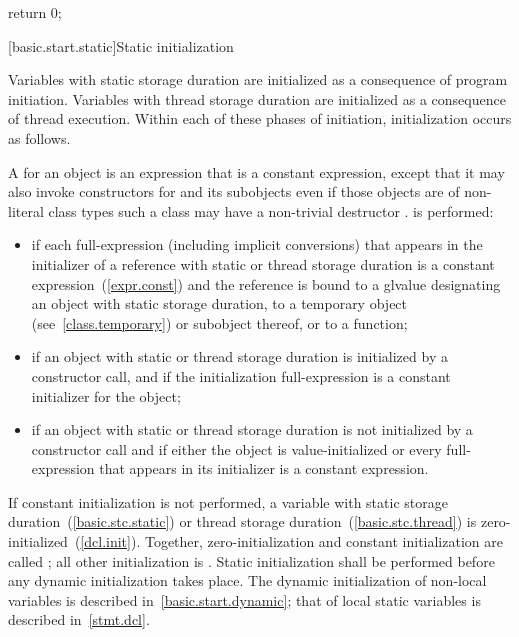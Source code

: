 \begin{codeblock}
return 0;
\end{codeblock}

[basic.start.static]{Static initialization}

\pnum
{}%
%
Variables with static storage duration
are initialized as a consequence of program initiation. Variables with
thread storage duration are initialized as a consequence of thread execution.
Within each of these phases of initiation, initialization occurs as follows.

\pnum
{}%
%
A  for an object  is an expression that is a
constant expression, except that it may also invoke  constructors
for  and its subobjects even if those objects are of non-literal class
types \enternote such a class may have a non-trivial destructor \exitnote.
 is performed:

\begin{itemize}
\item
if each full-expression (including implicit conversions) that appears in
the initializer of a reference with static or thread storage duration is a
constant expression~(\ref{expr.const}) and the reference is bound to a glvalue
designating an object with static storage duration, to a temporary object
(see~\ref{class.temporary}) or subobject thereof, or to a function;

\item
if an object with static or thread storage duration is initialized
by a constructor call, and if the initialization full-expression is a constant
initializer for the object;

\item
if an object with static or thread storage duration is not initialized by a constructor call
and if either the object is value-initialized or every full-expression that
appears in its initializer is a constant expression.

\end{itemize}

%
If constant initialization is not performed, a variable with static
storage duration~(\ref{basic.stc.static}) or thread storage
duration~(\ref{basic.stc.thread}) is zero-initialized~(\ref{dcl.init}).
Together, zero-initialization and constant initialization are called
%
;
all other initialization is .
Static initialization shall be performed before any dynamic initialization takes place.
\enternote The dynamic initialization of non-local variables is described
in~\ref{basic.start.dynamic}; that of local static variables is described
in~\ref{stmt.dcl}. \exitnote

